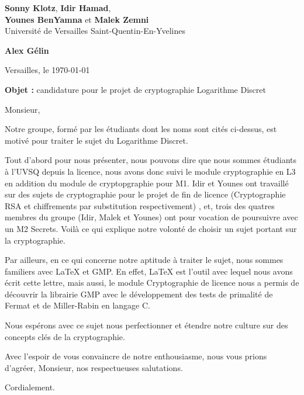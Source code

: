 \documentclass[10pt]{letter}
\begin{document}
\sffamily
	
	\begin{flushleft}
		\singlespacing
		\textbf{Sonny Klotz}, \textbf{Idir Hamad},\\ \textbf{Younes BenYamna} et \textbf{Malek Zemni}\\[.35ex]
		\footnotesize
		Université de Versailles Saint-Quentin-En-Yvelines 
	\end{flushleft}
	
	\begin{flushright}
		\singlespacing
		\textbf{Alex Gélin}\\[.35ex]
	\end{flushright}
 
	\begin{flushright}Versailles, le \today\\\end{flushright}

	\vspace{1em}
	
	\textbf{Objet :} candidature pour le projet de cryptographie \guillemotleft Logarithme Discret\guillemotright
	
	Monsieur,
	
	\hspace{1cm} Notre groupe, formé par les étudiants dont les noms sont cités ci-dessus, est motivé pour traiter le sujet du Logarithme Discret.
	
	\hspace{1cm} Tout d'abord pour nous présenter, nous pouvons dire que nous sommes étudiants à l'UVSQ depuis la licence, nous avons donc suivi le module cryptographie en L3 en addition du module de cryptopgraphie pour M1. Idir et Younes ont travaillé sur des sujets de cryptographie pour le projet de fin de licence (Cryptographie RSA et chiffrements par substitution respectivement) , et, trois des quatres membres du groupe (Idir, Malek et Younes) ont pour vocation de poursuivre avec un M2 Secrets. Voilà ce qui explique notre volonté de choisir un sujet portant sur la cryptographie.
	
	\hspace{1cm} Par ailleurs, en ce qui concerne notre aptitude à traiter le sujet, nous sommes familiers avec LaTeX et GMP. En effet, LaTeX est l'outil avec lequel nous avons écrit cette lettre, mais aussi, le module Cryptographie de licence nous a permis de découvrir la librairie GMP avec le développement des tests de primalité de Fermat et de Miller-Rabin en langage C.
	
	\hspace{1cm} Nous espérons avec ce sujet nous perfectionner et étendre notre culture sur des concepts clés de la cryptographie.
	
	\hspace{1cm} Avec l’espoir de vous convaincre de notre enthousiasme, nous vous prions d’agréer, Monsieur, nos respectueuses salutations.
	
	\begin{flushright}
		Cordialement.
	\end{flushright}
\end{document}
